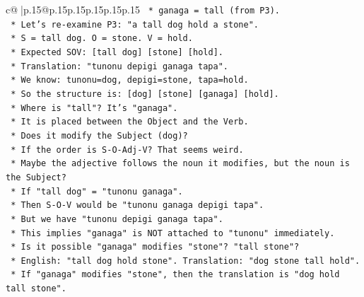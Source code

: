 \documentclass{article}
\begin{document}
{\begin{supertabular}{c@{$\;$}|p{.15\linewidth}@{}p{.15\linewidth}p{.15\linewidth}p{.15\linewidth}p{.15\linewidth}p{.15\linewidth}}
{{{\texttt{                                        *   ganaga = tall (from P3).} \\
\texttt{                                    *   Let's re{-}examine P3: "a tall dog hold a stone".} \\
\texttt{                                        *   S = tall dog. O = stone. V = hold.} \\
\texttt{                                        *   Expected SOV: {[}tall dog{]} {[}stone{]} {[}hold{]}.} \\
\texttt{                                        *   Translation: "tunonu depigi ganaga tapa".} \\
\texttt{                                        *   We know: tunonu=dog, depigi=stone, tapa=hold.} \\
\texttt{                                        *   So the structure is: {[}dog{]} {[}stone{]} {[}ganaga{]} {[}hold{]}.} \\
\texttt{                                        *   Where is "tall"? It's "ganaga".} \\
\texttt{                                        *   It is placed between the Object and the Verb.} \\
\texttt{                                        *   Does it modify the Subject (dog)?} \\
\texttt{                                        *   If the order is S{-}O{-}Adj{-}V? That seems weird.} \\
\texttt{                                        *   Maybe the adjective follows the noun it modifies, but the noun is the Subject?} \\
\texttt{                                        *   If "tall dog" = "tunonu ganaga".} \\
\texttt{                                        *   Then S{-}O{-}V would be "tunonu ganaga depigi tapa".} \\
\texttt{                                        *   But we have "tunonu depigi ganaga tapa".} \\
\texttt{                                        *   This implies "ganaga" is NOT attached to "tunonu" immediately.} \\
\texttt{                                        *   Is it possible "ganaga" modifies "stone"? "tall stone"?} \\
\texttt{                                        *   English: "tall dog hold stone". Translation: "dog stone tall hold".} \\
\texttt{                                        *   If "ganaga" modifies "stone", then the translation is "dog hold tall stone".} \\
}}}
\end{supertabular}}
\end{document}
